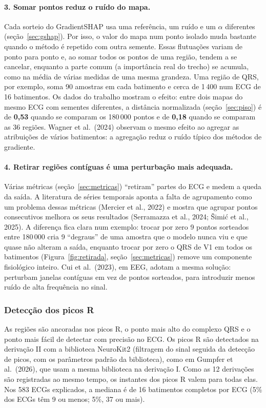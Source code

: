 \documentclass[11pt,a4paper]{article}
\begin{document}
\paragraph{3. Somar pontos reduz o ruído do mapa.} Cada sorteio do GradientSHAP usa uma referência, um ruído e um $\alpha$ diferentes (seção~\ref{sec:gshap}). Por isso, o valor do mapa num ponto isolado muda bastante quando o método é repetido com outra semente. Essas flutuações variam de ponto para ponto e, ao somar todos os pontos de uma região, tendem a se cancelar, enquanto a parte comum (a importância real do trecho) se acumula, como na média de várias medidas de uma mesma grandeza. Uma região de QRS, por exemplo, soma 90 amostras em cada batimento e cerca de 1\,400 num ECG de 16 batimentos. Os dados do trabalho mostram o efeito: entre dois mapas do mesmo ECG com sementes diferentes, a distância normalizada (seção~\ref{sec:piso}) é de \textbf{0,53} quando se comparam os 180\,000 pontos e de \textbf{0,18} quando se comparam as 36 regiões. Wagner et al.\ (2024) observam o mesmo efeito ao agregar as atribuições de vários batimentos: a agregação reduz o ruído típico dos métodos de gradiente.

\paragraph{4. Retirar regiões contíguas é uma perturbação mais adequada.} Várias métricas (seção~\ref{sec:metricas}) ``retiram'' partes do ECG e medem a queda da saída. A literatura de séries temporais aponta a falta de agrupamento como um problema dessas métricas (Mercier et al., 2022) e mostra que agrupar pontos consecutivos melhora os seus resultados (Serramazza et al., 2024; Šimić et al., 2025). A diferença fica clara num exemplo: trocar por zero 9 pontos sorteados entre 180\,000 cria 9 ``degraus'' de uma amostra que o modelo nunca viu e que quase não alteram a saída, enquanto trocar por zero o QRS de V1 em todos os batimentos (Figura~\ref{fig:retirada}, seção~\ref{sec:metricas}) remove um componente fisiológico inteiro. Cui et al.\ (2023), em EEG, adotam a mesma solução: perturbam janelas contíguas em vez de pontos sorteados, para introduzir menos ruído de alta frequência no sinal.

\subsubsection{Detecção dos picos R}
As regiões são ancoradas nos picos R, o ponto mais alto do complexo QRS e o ponto mais fácil de detectar com precisão no ECG. Os picos R são detectados na derivação II com a biblioteca NeuroKit2 (filtragem do sinal seguida da detecção de picos, com os parâmetros padrão da biblioteca), como em Gumpfer et al.\ (2026), que usam a mesma biblioteca na derivação I. Como as 12 derivações são registradas ao mesmo tempo, os instantes dos picos R valem para todas elas. Nos 583 ECGs explicados, a mediana é de 16 batimentos completos por ECG (5\% dos ECGs têm 9 ou menos; 5\%, 37 ou mais).
\end{document}
